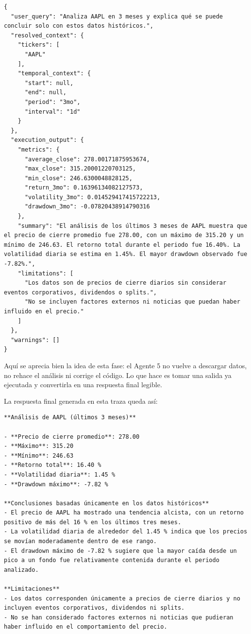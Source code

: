 \begin{lstlisting}[style=traceblock]
{
  "user_query": "Analiza AAPL en 3 meses y explica qué se puede concluir solo con estos datos históricos.",
  "resolved_context": {
    "tickers": [
      "AAPL"
    ],
    "temporal_context": {
      "start": null,
      "end": null,
      "period": "3mo",
      "interval": "1d"
    }
  },
  "execution_output": {
    "metrics": {
      "average_close": 278.00171875953674,
      "max_close": 315.20001220703125,
      "min_close": 246.6300048828125,
      "return_3mo": 0.16396134082127573,
      "volatility_3mo": 0.014529417415722213,
      "drawdown_3mo": -0.07820438914790316
    },
    "summary": "El análisis de los últimos 3 meses de AAPL muestra que el precio de cierre promedio fue 278.00, con un máximo de 315.20 y un mínimo de 246.63. El retorno total durante el periodo fue 16.40%. La volatilidad diaria se estima en 1.45%. El mayor drawdown observado fue -7.82%.",
    "limitations": [
      "Los datos son de precios de cierre diarios sin considerar eventos corporativos, dividendos o splits.",
      "No se incluyen factores externos ni noticias que puedan haber influido en el precio."
    ]
  },
  "warnings": []
}
\end{lstlisting}

Aqu\'i se aprecia bien la idea de esta fase: el Agente 5 no vuelve a descargar datos, no rehace el an\'alisis ni corrige el c\'odigo. Lo que hace es tomar una
salida ya ejecutada y convertirla en una respuesta final legible.

La respuesta final generada en esta traza queda as\'i:

\begin{lstlisting}[style=traceblock]
**Análisis de AAPL (últimos 3 meses)**

- **Precio de cierre promedio**: 278.00
- **Máximo**: 315.20
- **Mínimo**: 246.63
- **Retorno total**: 16.40 %
- **Volatilidad diaria**: 1.45 %
- **Drawdown máximo**: -7.82 %

**Conclusiones basadas únicamente en los datos históricos**
- El precio de AAPL ha mostrado una tendencia alcista, con un retorno positivo de más del 16 % en los últimos tres meses.
- La volatilidad diaria de alrededor del 1.45 % indica que los precios se movían moderadamente dentro de ese rango.
- El drawdown máximo de -7.82 % sugiere que la mayor caída desde un pico a un fondo fue relativamente contenida durante el periodo analizado.

**Limitaciones**
- Los datos corresponden únicamente a precios de cierre diarios y no incluyen eventos corporativos, dividendos ni splits.
- No se han considerado factores externos ni noticias que pudieran haber influido en el comportamiento del precio.
\end{lstlisting}

